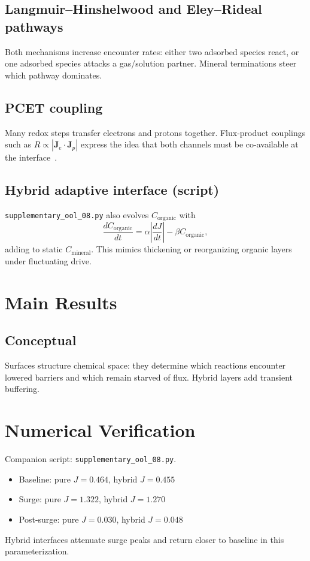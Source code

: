 \documentclass[11pt,a4paper]{article}
\begin{document}
\subsection{Langmuir--Hinshelwood and Eley--Rideal pathways}
Both mechanisms increase encounter rates: either two adsorbed species react, or one adsorbed species attacks a gas/solution partner. Mineral terminations steer which pathway dominates.

\subsection{PCET coupling}
Many redox steps transfer electrons and protons together. Flux-product couplings such as $R\propto |\bm{J}_e\cdot\bm{J}_p|$ express the idea that both channels must be co-available at the interface~\cite{Lane2010}.

\subsection{Hybrid adaptive interface (script)}
\texttt{supplementary\_ool\_08.py} also evolves $C_{\mathrm{organic}}$ with
\begin{equation}
\frac{dC_{\mathrm{organic}}}{dt}
= \alpha\left|\frac{dJ}{dt}\right| - \beta C_{\mathrm{organic}},
\end{equation}
adding to static $C_{\mathrm{mineral}}$. This mimics thickening or reorganizing organic layers under fluctuating drive.

\section{Main Results}

\subsection{Conceptual}
Surfaces structure chemical space: they determine which reactions encounter lowered barriers and which remain starved of flux. Hybrid layers add transient buffering.

\section{Numerical Verification}
Companion script: \texttt{supplementary\_ool\_08.py}.
\begin{itemize}
\item Baseline: pure $J=0.464$, hybrid $J=0.455$
\item Surge: pure $J=1.322$, hybrid $J=1.270$
\item Post-surge: pure $J=0.030$, hybrid $J=0.048$
\end{itemize}
Hybrid interfaces attenuate surge peaks and return closer to baseline in this parameterization.
\end{document}
